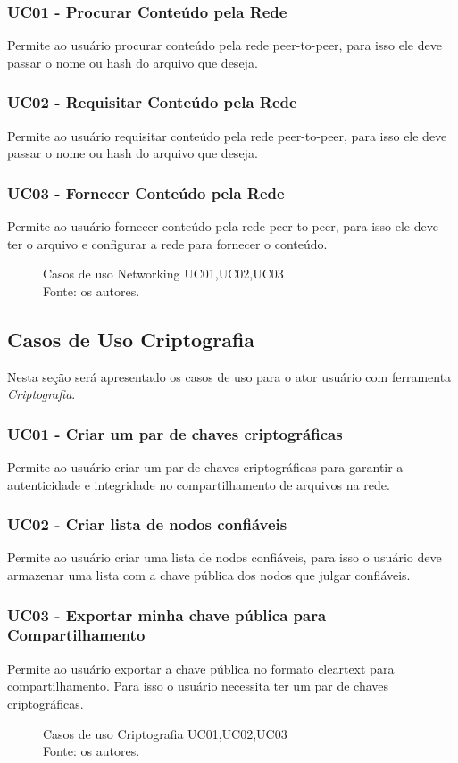\subsubsection{UC01 - Procurar Conteúdo pela Rede}
Permite ao usuário procurar conteúdo pela rede peer-to-peer, para isso ele deve passar o nome ou hash do arquivo que deseja.
\subsubsection{UC02 - Requisitar Conteúdo pela Rede}
Permite ao usuário requisitar conteúdo pela rede peer-to-peer, para isso ele deve passar o nome ou hash do arquivo que deseja.
\subsubsection{UC03 - Fornecer Conteúdo pela Rede}
Permite ao usuário fornecer conteúdo pela rede peer-to-peer, para isso ele deve ter o arquivo e configurar a rede para fornecer o conteúdo.
\begin{figure}[H]
    \centering
    
    \caption[Casos de uso Networking UC01,UC02,UC03]{\label{fig:Ator_Networking2}
        Casos de uso Networking UC01,UC02,UC03\\
        Fonte: os autores.
    }
\end{figure}
\subsection{Casos de Uso Criptografia}
Nesta seção será apresentado os casos de uso para o ator usuário com ferramenta \textit{Criptografia}.
\subsubsection{UC01 - Criar um par de chaves criptográficas}
Permite ao usuário criar um par de chaves criptográficas para garantir a autenticidade e integridade no compartilhamento de arquivos na rede.
\subsubsection{UC02 - Criar lista de nodos confiáveis}
Permite ao usuário criar uma lista de nodos confiáveis, para isso o usuário deve armazenar uma lista com a chave pública dos nodos que julgar confiáveis.
\subsubsection{UC03 - Exportar minha chave pública para Compartilhamento}
Permite ao usuário exportar a chave pública no formato cleartext para compartilhamento. Para isso o usuário necessita ter um par de chaves criptográficas. 
\begin{figure}[H]
    \centering
    
    \caption[Casos de uso Criptografia UC01,UC02,UC03]{\label{fig:Ator_Crypto1}
        Casos de uso Criptografia UC01,UC02,UC03\\
        Fonte: os autores.
    }
\end{figure}
